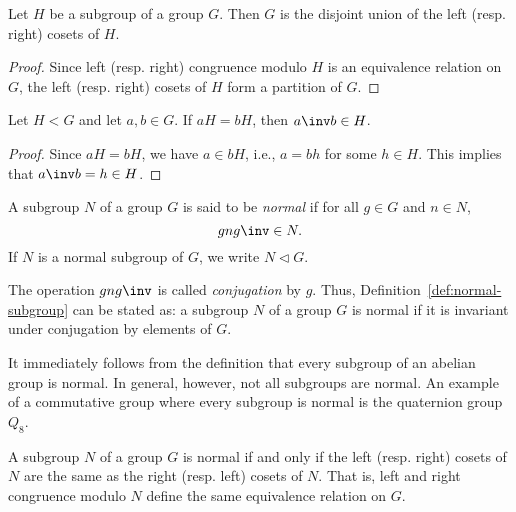 \begin{theorem}
    Let \(H\) be a subgroup of a group \(G\). Then \(G\) is the disjoint union
    of the left (resp. right) cosets of \(H\).
\end{theorem}

\begin{proof}
    Since left (resp. right) congruence modulo \(H\) is an equivalence relation
    on \(G\), the left (resp. right) cosets of \(H\) form a partition of \(G\).
\end{proof}

\begin{theorem}
    Let \(H < G\) and let \(a, b \in G\). If \(aH = bH\), then \(a\inv b \in
    H\).
\end{theorem}

\begin{proof}
    Since \(aH = bH\), we have \(a \in bH\), i.e., \(a = bh\) for some \(h \in
    H\). This implies that \(a\inv b = h \in H\).
\end{proof}

\begin{definition}
    \label{def:normal-subgroup}
    A subgroup \(N\) of a group \(G\) is said to be \emph{normal} if for all \(g
    \in G\) and \(n \in N\),
    \[
        gng\inv \in N.
    \]
    If \(N\) is a normal subgroup of \(G\), we write \(N \triangleleft G\).
\end{definition}

\begin{remark}
    The operation \(gng\inv\) is called \emph{conjugation} by \(g\). Thus,
    Definition~\ref{def:normal-subgroup} can be stated as: a subgroup \(N\) of a
    group \(G\) is normal if it is invariant under conjugation by elements of
    \(G\).
\end{remark}

\begin{example}
    It immediately follows from the definition that every subgroup of an abelian
    group is normal. In general, however, not all subgroups are normal. An
    example of a commutative group where every subgroup is normal is the
    quaternion group \(Q_8\).
\end{example}

\begin{theorem}
    A subgroup \(N\) of a group \(G\) is normal if and only if the left (resp.
    right) cosets of \(N\) are the same as the right (resp. left) cosets of
    \(N\). That is, left and right congruence modulo \(N\) define the same
    equivalence relation on \(G\).
\end{theorem}

